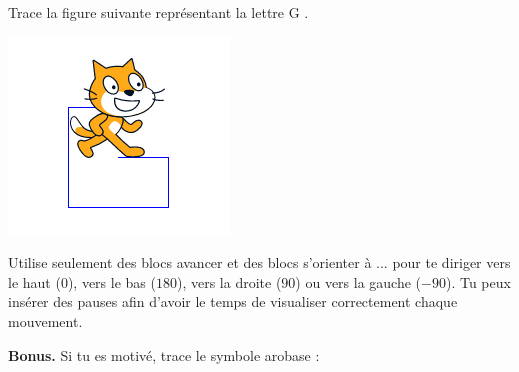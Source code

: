 \documentclass[class=report,crop=false, 12pt]{standalone}
\begin{document}
\begin{activite}

Trace la figure suivante représentant la lettre \og G \fg{}.

\begin{center}
\begin{minipage}{0.3\textwidth}
\includegraphics[width=\textwidth]{ecran-01-ex2}
\end{minipage}
\begin{minipage}{0.3\textwidth}
\end{minipage}
\begin{minipage}{0.3\textwidth}
\begin{scratch}
  \blockspace[0.5]
  \blockspace[0.5]
  \blockspace[0.5]
\end{scratch}
\end{minipage}
\end{center}

Utilise seulement des blocs \og avancer \fg{} et des blocs \og s'orienter à ... \fg{} pour te diriger vers le haut ($0$\textdegree), vers le bas ($180$\textdegree), vers la droite ($90$\textdegree) ou vers la gauche ($-90$\textdegree). Tu peux insérer des pauses afin d'avoir le temps de visualiser correctement chaque mouvement.

\bigskip

\textbf{Bonus.} 
Si tu es motivé, trace le symbole \og arobase \fg{}  \at :
 
\end{activite}
\end{document}
